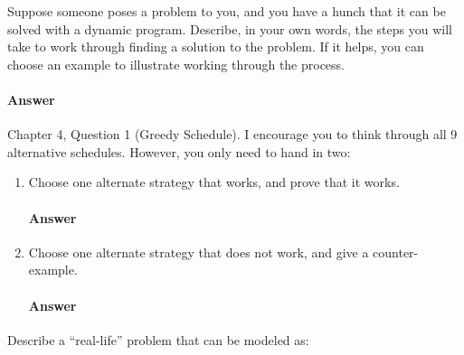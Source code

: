 \documentclass{article}
\begin{document}
\collab{\todo{}}

Suppose someone poses a problem to you, and you have a hunch that it can be
solved with a dynamic program.  Describe, in your own words, the steps you will
take to work through finding a solution to the problem.  If it helps, you can
choose an example to illustrate working through the process.

\paragraph{Answer}
\todo{}


\collab{\todo{}}

Chapter 4, Question 1 (Greedy Schedule).  I encourage you to think through all 9
alternative schedules.  However, you only need to hand in two:
\begin{enumerate}
    \item Choose one alternate strategy that
        works, and prove that it works.

    \paragraph{Answer}
    \todo{}

    \item Choose one alternate strategy that does not work, and give a
        counter-example.

    \paragraph{Answer}
    \todo{}

\end{enumerate}

\collab{\todo{}}

Describe a ``real-life'' problem that can be modeled as:
\end{document}
